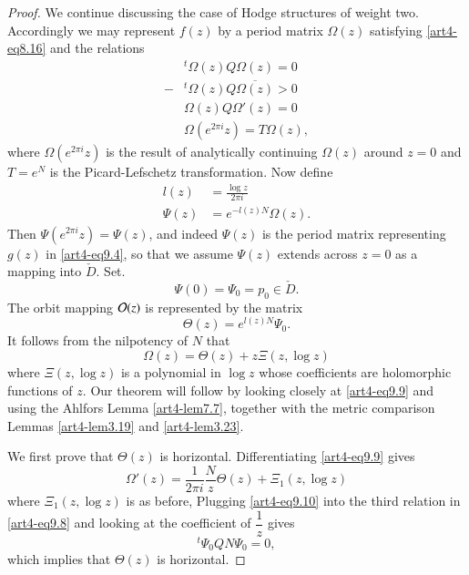 \begin{proof}
We continue discussing the case of Hodge structures of weight two.  Accordingly we may represent $f(z)$ by a period matrix $\Omega(z)$ satisfying \eqref{art4-eq8.16} and the relations
\begin{align*}
&{}^t \Omega (z) Q \Omega (z) = 0\\
- & {}^t \Omega (z) Q \overline{\Omega(z)} > 0\\
&\Omega (z) Q \Omega' (z) =0\\
&\Omega (e^{2 \pi i} z) = T \Omega (z),
\end{align*}
where $\Omega (e^{2\pi i }z)$ is the result of analytically continuing $\Omega (z)$ around $z = 0$ and $T = e^N$ is the Picard-Lefschetz transformation. Now define
\begin{align*}
l (z) & = \frac{\log z}{2 \pi i}\\
\Psi (z) & = e^{-l (z) N } \Omega (z).
\end{align*}
Then $\Psi (e^{2 \pi i} z) = \Psi (z)$, and indeed $\Psi (z)$ is the period matrix representing $g(z)$ in \eqref{art4-eq9.4}, so that we assume $\Psi (z)$ extends across $z =0$ as a mapping into $\check{D}$. Set.
$$
\Psi (0) = \Psi_0 = p_0 \in \check{D}.
$$
The orbit mapping $\mathcal{O}(z)$ is represented by the matrix
$$
\Theta (z) = e^{l(z) N} \Psi_0.
$$
It follows from the nilpotency of $N$ that
\setcounter{equation}{8}
\begin{equation}
\Omega (z) = \Theta (z) + z \Xi (z, \log z) 
\label{art4-eq9.9}
\end{equation}
where $\Xi (z, \log z)$ is a polynomial in $\log z$ whose coefficients are holomorphic functions of $z$. Our theorem will follow by looking closely at \eqref{art4-eq9.9} and using the Ahlfors Lemma \eqref{art4-lem7.7}, together with the metric comparison Lemmas \eqref{art4-lem3.19} and \eqref{art4-lem3.23}.

We first prove that $\Theta (z)$ is horizontal. Differentiating \eqref{art4-eq9.9} gives
\begin{equation}
\Omega'(z) = \frac{1}{2 \pi i} \frac{N}{z} \Theta (z) + \Xi_1 (z, \log z) 
\label{art4-eq9.10}
\end{equation}\pageoriginale 
where $\Xi_1(z, \log z)$ is as before, Plugging \eqref{art4-eq9.10} into the third relation in \eqref{art4-eq9.8} and looking at the coefficient of $\dfrac{1}{z}$ gives
$$
{}^t \Psi_0 Q N \Psi_0 = 0,
$$
which implies that $\Theta (z)$ is horizontal.


\end{proof}
